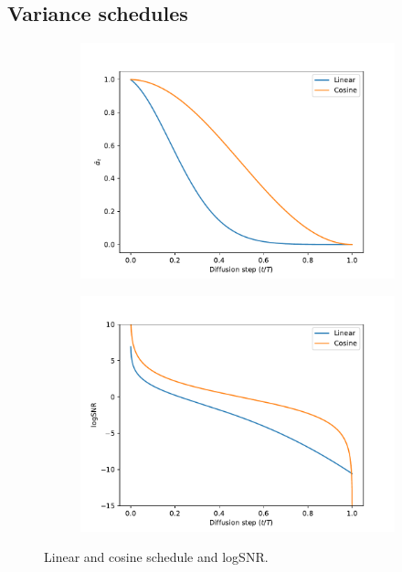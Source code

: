 \subsection{Variance schedules}
\begin{figure}[H]
    \centering
    \begin{subfigure}[b]{0.49\linewidth}
        \centering
        \includegraphics[width=\linewidth]{figures/schedule.pdf}    
    \end{subfigure}
    \hfill
    \begin{subfigure}[b]{0.49\linewidth}
        \centering
        \includegraphics[width=\linewidth]{figures/snr.pdf}    
    \end{subfigure}
    \caption{Linear and cosine schedule and logSNR.}
    \label{fig:schedule}
\end{figure}
